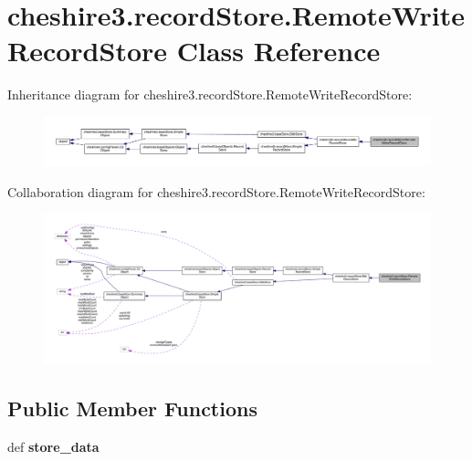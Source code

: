 \hypertarget{classcheshire3_1_1record_store_1_1_remote_write_record_store}{\section{cheshire3.\-record\-Store.\-Remote\-Write\-Record\-Store Class Reference}
\label{classcheshire3_1_1record_store_1_1_remote_write_record_store}
}


Inheritance diagram for cheshire3.\-record\-Store.\-Remote\-Write\-Record\-Store\-:
\nopagebreak
\begin{figure}[H]
\begin{center}
\leavevmode
\includegraphics[width=350pt]{classcheshire3_1_1record_store_1_1_remote_write_record_store__inherit__graph}
\end{center}
\end{figure}


Collaboration diagram for cheshire3.\-record\-Store.\-Remote\-Write\-Record\-Store\-:
\nopagebreak
\begin{figure}[H]
\begin{center}
\leavevmode
\includegraphics[width=350pt]{classcheshire3_1_1record_store_1_1_remote_write_record_store__coll__graph}
\end{center}
\end{figure}
\subsection*{Public Member Functions}
\begin{DoxyCompactItemize}
\item 
\hypertarget{classcheshire3_1_1record_store_1_1_remote_write_record_store_ad65f3a3dc1dd8a790d42093b7e7f5f45}{def {\bfseries store\-\_\-data}}\label{classcheshire3_1_1record_store_1_1_remote_write_record_store_ad65f3a3dc1dd8a790d42093b7e7f5f45}

\end{DoxyCompactItemize}
